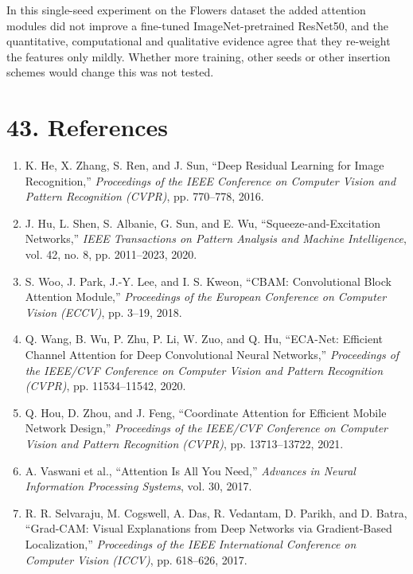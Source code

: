 \documentclass[10pt]{article}
\begin{document}
In this single-seed experiment on the Flowers dataset the added attention modules did not improve a fine-tuned ImageNet-pretrained ResNet50, and the quantitative, computational and qualitative evidence agree that they re-weight the features only mildly.
Whether more training, other seeds or other insertion schemes would change this was not tested.

\section*{43. References}

\begin{enumerate}

\item
K. He, X. Zhang, S. Ren, and J. Sun,
``Deep Residual Learning for Image Recognition,''
\textit{Proceedings of the IEEE Conference on Computer Vision and Pattern
Recognition (CVPR)}, pp. 770--778, 2016.

\item
J. Hu, L. Shen, S. Albanie, G. Sun, and E. Wu,
``Squeeze-and-Excitation Networks,''
\textit{IEEE Transactions on Pattern Analysis and Machine Intelligence},
vol. 42, no. 8, pp. 2011--2023, 2020.

\item
S. Woo, J. Park, J.-Y. Lee, and I. S. Kweon,
``CBAM: Convolutional Block Attention Module,''
\textit{Proceedings of the European Conference on Computer Vision (ECCV)},
pp. 3--19, 2018.

\item
Q. Wang, B. Wu, P. Zhu, P. Li, W. Zuo, and Q. Hu,
``ECA-Net: Efficient Channel Attention for Deep Convolutional Neural
Networks,''
\textit{Proceedings of the IEEE/CVF Conference on Computer Vision and Pattern
Recognition (CVPR)}, pp. 11534--11542, 2020.

\item
Q. Hou, D. Zhou, and J. Feng,
``Coordinate Attention for Efficient Mobile Network Design,''
\textit{Proceedings of the IEEE/CVF Conference on Computer Vision and Pattern
Recognition (CVPR)}, pp. 13713--13722, 2021.

\item
A. Vaswani et al.,
``Attention Is All You Need,''
\textit{Advances in Neural Information Processing Systems},
vol. 30, 2017.

\item
R. R. Selvaraju, M. Cogswell, A. Das, R. Vedantam,
D. Parikh, and D. Batra,
``Grad-CAM: Visual Explanations from Deep Networks via
Gradient-Based Localization,''
\textit{Proceedings of the IEEE International Conference on Computer Vision
(ICCV)}, pp. 618--626, 2017.


\end{enumerate}
\end{document}
